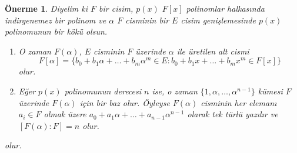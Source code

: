\documentclass[draft]{article}
\newtheorem{prop}[thm]{Önerme}
\theoremstyle{definition}
\theoremstyle{remark}
\begin{document}
			\begin{prop}
			    Diyelim ki $F$ bir cisim, $p(x)$ $F[x]$ polinomlar halkasında indirgenemez bir polinom ve $\alpha$ $F$ cisminin bir $E$ cisim genişlemesinde $p(x)$ polinomunun bir kökü olsun.
				\begin{enumerate}
				\renewcommand{\labelenumi}{(\roman{enumi})}
				    \item O zaman $F(\alpha)$, $E$ cisminin $F$ üzerinde $\alpha$ ile üretilen alt cismi
					\begin{equation*}
					    F[\alpha] = \{b_0 + b_1\alpha + \dots + b_{m}\alpha^m \in E : b_0 + b_1x + \dots + b_{m}x^m \in F[x] \}
					\end{equation*}
					olur.
					\item Eğer $p(x)$ polinomunun derecesi $n$ ise, o zaman $\{1, \alpha, \dots, \alpha^{n - 1}\}$ kümesi $F$ üzerinde $F(\alpha)$ için bir baz olur. Öyleyse $F(\alpha)$ cisminin her elemanı $a_i \in F$ olmak üzere $a_0 + a_1\alpha + \dots + a_{n - 1}\alpha^{n - 1}$ olarak tek türlü yazılır ve $[F(\alpha):F] = n$ olur.
				\end{enumerate}
				olur.
			\end{prop}
			
\end{document}
